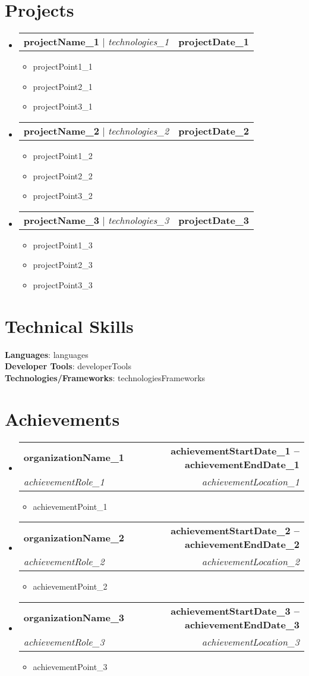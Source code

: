 \documentclass[letterpaper,11pt]{article}
\makeatletter
\newcommand{\resumeItem}[1]{\item\small{#1 \vspace{-2pt}}}
\newcommand{\resumeSubheading}[4]{
  \vspace{-2pt}\item
  \begin{tabular*}{1.0\textwidth}[t]{l@{\extracolsep{\fill}}r}
    \textbf{#1} & \textbf{\small #2} \\
    \textit{\small#3} & \textit{\small #4} \\
  \end{tabular*}\vspace{-7pt}
}
\newcommand{\resumeProjectHeading}[2]{
  \item
  \begin{tabular*}{1.001\textwidth}{l@{\extracolsep{\fill}}r}
    \small#1 & \textbf{\small #2}\\
  \end{tabular*}\vspace{-7pt}
}
\newcommand{\resumeSubHeadingListStart}{\begin{itemize}[leftmargin=0.0in, label={}]}
\newcommand{\resumeSubHeadingListEnd}{\end{itemize}}
\newcommand{\resumeItemListStart}{\begin{itemize}}
\newcommand{\resumeItemListEnd}{\end{itemize}\vspace{-5pt}}
\makeatother
\begin{document}
\section{Projects}
\resumeSubHeadingListStart
\resumeProjectHeading
    {\textbf{ {{{projectName_1}}} } $|$ \emph{ {{{technologies_1}}} }}{ {{{projectDate_1}}} }
    \resumeItemListStart
      \resumeItem{ {{{projectPoint1_1}}} }
      \resumeItem{ {{{projectPoint2_1}}} }
      \resumeItem{ {{{projectPoint3_1}}} }
    \resumeItemListEnd
\resumeProjectHeading
    {\textbf{ {{{projectName_2}}} } $|$ \emph{ {{{technologies_2}}} }}{ {{{projectDate_2}}} }
    \resumeItemListStart
      \resumeItem{ {{{projectPoint1_2}}} }
      \resumeItem{ {{{projectPoint2_2}}} }
      \resumeItem{ {{{projectPoint3_2}}} }
    \resumeItemListEnd
\resumeProjectHeading
    {\textbf{ {{{projectName_3}}} } $|$ \emph{ {{{technologies_3}}} }}{ {{{projectDate_3}}} }
    \resumeItemListStart
      \resumeItem{ {{{projectPoint1_3}}} }
      \resumeItem{ {{{projectPoint2_3}}} }
      \resumeItem{ {{{projectPoint3_3}}} }
    \resumeItemListEnd
\resumeSubHeadingListEnd

\section{Technical Skills}
\begin{itemize}[leftmargin=0.15in, label={}]
    \small{\item{
     \textbf{Languages}{: {{{languages}}}} \\
     \textbf{Developer Tools}{: {{{developerTools}}}} \\
     \textbf{Technologies/Frameworks}{: {{{technologiesFrameworks}}}} \\
    }}
\end{itemize}
\vspace{-16pt}

\section{Achievements}
\resumeSubHeadingListStart
\resumeSubheading
    { {{{organizationName_1}}} }{ {{{achievementStartDate_1}}} -- {{{achievementEndDate_1}}} }{ {{{achievementRole_1}}} }{ {{{achievementLocation_1}}} }
    \resumeItemListStart
        \resumeItem{ {{{achievementPoint_1}}} }
    \resumeItemListEnd
\resumeSubheading
    { {{{organizationName_2}}} }{ {{{achievementStartDate_2}}} -- {{{achievementEndDate_2}}} }{ {{{achievementRole_2}}} }{ {{{achievementLocation_2}}} }
    \resumeItemListStart
        \resumeItem{ {{{achievementPoint_2}}} }
    \resumeItemListEnd
\resumeSubheading
    { {{{organizationName_3}}} }{ {{{achievementStartDate_3}}} -- {{{achievementEndDate_3}}} }{ {{{achievementRole_3}}} }{ {{{achievementLocation_3}}} }
    \resumeItemListStart
        \resumeItem{ {{{achievementPoint_3}}} }
    \resumeItemListEnd
\resumeSubHeadingListEnd
\end{document}
